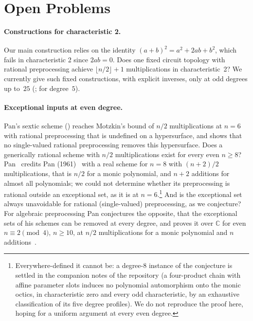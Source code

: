 \section{Open Problems}
\label{sec:open-problems}

\paragraph{Constructions for characteristic 2.}
Our main construction relies on the identity $(a+b)^2 = a^2 + 2ab + b^2$, which fails in characteristic 2 since $2ab = 0$.
Does one fixed circuit topology with rational preprocessing achieve
$\lfloor n/2\rfloor+1$ multiplications in characteristic~2?  We currently give
such fixed constructions, with explicit inverses, only at odd degrees up
to~$25$ (;  for degree~$5$).

\paragraph{Exceptional inputs at even degree.}
Pan's sextic scheme () reaches Motzkin's bound of $n/2$
multiplications at $n=6$ with rational preprocessing that is undefined on a
hypersurface, and  shows that no single-valued rational
preprocessing removes this hypersurface.
Does a generically rational scheme with $n/2$ multiplications exist for every even
$n\ge8$?  Pan~\cite{pan1978complex} credits Pan (1961)~\cite{pan1961schemes} with a
real scheme for $n=8$ with $(n+2)/2$ multiplications, that is $n/2$ for a monic
polynomial, and $n+2$ additions for almost all polynomials; we could not
determine whether its preprocessing is rational outside an exceptional set, as it
is at $n=6$.\footnote{Everywhere-defined it cannot be: a degree-$8$ instance of the
conjecture is settled in the companion notes of the repository (a four-product chain
with affine parameter slots induces no polynomial automorphism onto the monic
octics, in characteristic zero and every odd characteristic, by an exhaustive
classification of its five degree profiles).  We do not reproduce the proof here,
hoping for a uniform argument at every even degree.}  And is the
exceptional set always unavoidable for rational (single-valued) preprocessing, as we
conjecture?  For algebraic preprocessing Pan conjectures the opposite, that the
exceptional sets of his schemes can be removed at every degree, and proves it over
$\mathbb C$ for even $n\equiv2\pmod4$, $n\ge10$, at $n/2$ multiplications for a monic
polynomial and $n$ additions~\cite{pan1978complex}.


